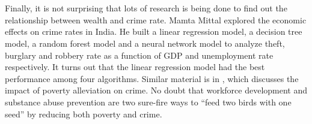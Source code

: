 \documentclass[letterpaper, 11 pt, conference]{article}
\begin{document}
\\
\\Finally, it is not surprising that lots of research is being done to find out the relationship between wealth and crime rate. Mamta Mittal explored the economic effects on crime rates in India. He built a linear regression model, a decision tree model, a random forest model and a neural network model to analyze theft, burglary and robbery rate as a function of GDP and unemployment rate respectively. It turns out that the linear regression model had the best performance among four algorithms\cite{ref6}. Similar material is in \cite{ref4}, which discusses the impact of poverty alleviation on crime. No doubt that workforce development and substance abuse prevention are two sure-fire ways to “feed two birds with one seed” by reducing both poverty and crime.
\\
\end{document}
